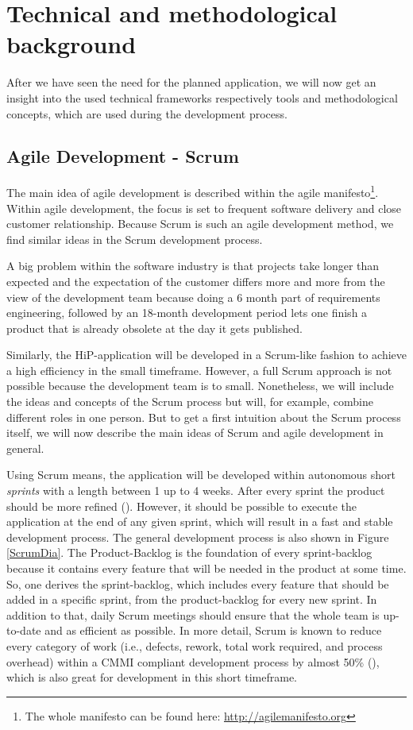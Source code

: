 \chapter[Technical and methodological background]{Technical and methodological background}
After we have seen the need for the planned application, we will now get an insight into the used technical frameworks respectively tools and methodological concepts, which are used during the development process.  

\section{Agile Development - Scrum}
\label{SCRUM-intro}
The main idea of agile development is described within the agile manifesto\footnote{The whole manifesto can be found here: \url{http://agilemanifesto.org}}. Within agile development, the focus is set to frequent software delivery and close customer relationship. Because Scrum is such an agile development method, we find similar ideas in the Scrum development process.

A big problem within the software industry is that projects take longer than expected and the expectation of the customer differs more and more from the view of the development team because doing a 6 month part of requirements engineering, followed by an 18-month development period lets one finish a product that is already obsolete at the day it gets published.

Similarly, the HiP-application will be developed in a Scrum-like fashion to achieve a high efficiency in the small timeframe. However, a full Scrum approach is not possible because the development team is to small. Nonetheless, we will include the ideas and concepts of the Scrum process but will, for example, combine different roles in one person. But to get a first intuition about the Scrum process itself, we will now describe the main ideas of Scrum and agile development in general.

Using Scrum means, the application will be developed within autonomous short \textit{sprints} with a length between 1 up to 4 weeks. After every sprint the product should be more refined (\cite{scrum}). However, it should be possible to execute the application at the end of any given sprint, which will result in a fast and stable development process. The general development process is also shown in Figure \ref{ScrumDia}. The Product-Backlog is the foundation of every sprint-backlog because it contains every feature that will be needed in the product at some time. So, one derives the sprint-backlog, which includes every feature that should be added in a specific sprint, from the product-backlog for every new sprint. In addition to that, daily Scrum meetings should ensure that the whole team is up-to-date and as efficient as possible. In more detail, Scrum is known to reduce every category of work (i.e., defects, rework, total work required, and process overhead) within a \ac{CMMI} compliant development process by almost 50\% (\cite{Sut09}), which is also great for development in this short timeframe.

